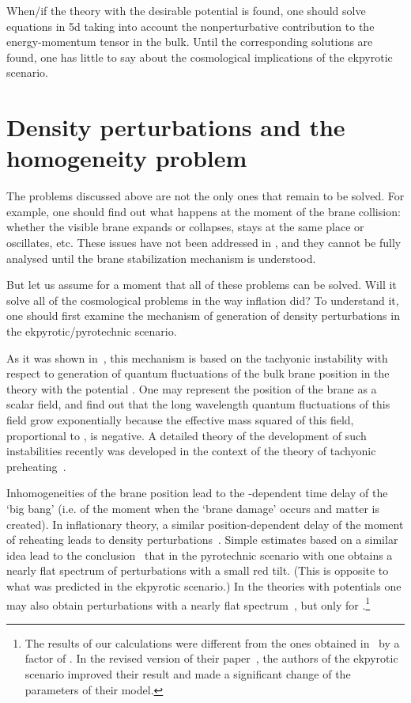 \documentclass[a4paper,12pt]{article}
\begin{document}
When/if the theory with the desirable potential \coordHE{} is found, one should solve equations in 5d taking into account the nonperturbative contribution to the energy-momentum tensor in the bulk.    Until the corresponding solutions are found, one has little to say about the cosmological implications of the ekpyrotic scenario.

\section{Density perturbations and the homogeneity problem}

The problems discussed above are not the only ones that remain to be solved. For example, one should find out what happens at the moment of the brane   
collision: whether the visible brane expands or collapses,  stays at the same   
place or oscillates, etc. These issues  have not been addressed in   
\cite{KOST}, and they cannot be fully analysed until the brane   
stabilization mechanism is understood.  

But let us assume for a moment that all of these problems can be solved. Will it solve all of the cosmological problems in the way inflation did? To understand it, one should first examine the mechanism of generation of density perturbations in the ekpyrotic/pyrotechnic scenario. 

As it was shown in~\cite{KKL}, this mechanism is based on the tachyonic instability with respect to generation of quantum fluctuations of the bulk brane position in the theory with the potential \coordHE{}. One may represent the position of the brane \coordHE{} as a scalar field, and find out that the long wavelength quantum fluctuations of this field grow exponentially because the effective mass squared of this field, proportional to \coordHE{}, is negative.    A detailed theory of the development of such instabilities recently was developed in the context of the theory of tachyonic preheating~\cite{tach}.

Inhomogeneities of the brane position lead to the \coordHE{}-dependent time delay of the `big bang' (i.e. of the moment when the `brane damage' occurs and matter is created). In inflationary theory, a similar position-dependent delay of the moment of reheating leads to density perturbations~\cite{Mukh,Hawk,Mukh2}. Simple estimates based on a similar idea lead to the conclusion~\cite{KKL} that in the pyrotechnic scenario with \coordHE{} one obtains a nearly flat spectrum of perturbations with a small red tilt. (This is opposite to what was predicted in the ekpyrotic scenario.)  In the theories with potentials \coordHE{} one may also obtain perturbations with a nearly flat spectrum~\cite{KKL}, but only for \coordHE{}.\footnote{The results of our calculations were different from the ones obtained in~\cite{KOST} by a factor of \coordHE{}. In the revised version of their paper~\cite{KOST}, the authors of the ekpyrotic scenario improved their result and made a significant change of the parameters of their model.}  
\end{document}
